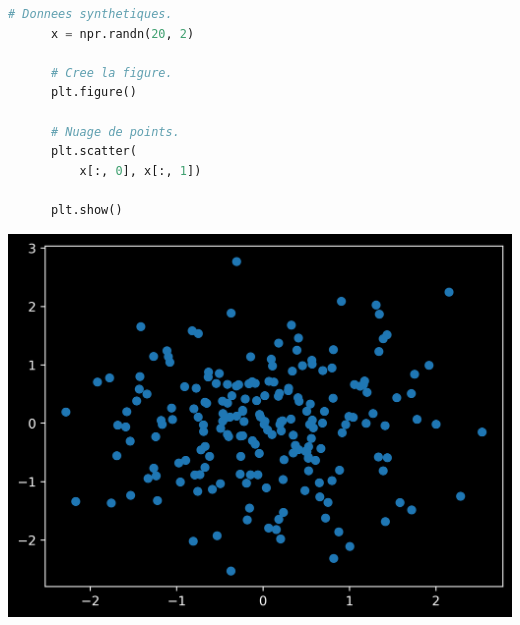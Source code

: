 \documentclass[aspectratio=169]{beamer}
\begin{document}
{
}

\begin{frame}[fragile]{}{}
  \vfill
  \begin{minipage}{.48\textwidth}
    \begin{lstlisting}[language=Python]
      # Donnees synthetiques.
      x = npr.randn(20, 2)

      # Cree la figure.
      plt.figure()

      # Nuage de points.
      plt.scatter(
          x[:, 0], x[:, 1])

      plt.show()
    \end{lstlisting}
  \end{minipage}%
  \hfill
  \begin{minipage}{.48\textwidth}
    \centering
    \includegraphics[width=\textwidth]{scatter_plot_default}
  \end{minipage}
  \vfill
\end{frame}
\end{document}
